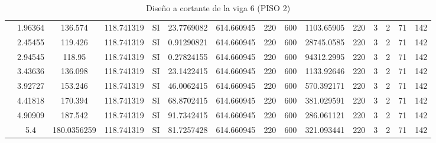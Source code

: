 \begin{table}[H]
{\begin{tabular}{|c|c|c|c|c|c|c|c|c|c|c|c|c|c|c|}
\cline{2-15}    & 1.96364 & 136.574 & 118.741319 & SI  & 23.7769082 & 614.660945 & 220 & 600 & 1103.65905 & 220 & 3   & 2   & 71  & 142 \bigstrut\\
\cline{2-15}    & 2.45455 & 119.426 & 118.741319 & SI  & 0.91290821 & 614.660945 & 220 & 600 & 28745.0585 & 220 & 3   & 2   & 71  & 142 \bigstrut\\
\cline{2-15}    & 2.94545 & 118.95 & 118.741319 & SI  & 0.27824155 & 614.660945 & 220 & 600 & 94312.2995 & 220 & 3   & 2   & 71  & 142 \bigstrut\\
\cline{2-15}    & 3.43636 & 136.098 & 118.741319 & SI  & 23.1422415 & 614.660945 & 220 & 600 & 1133.92646 & 220 & 3   & 2   & 71  & 142 \bigstrut\\
\cline{2-15}    & 3.92727 & 153.246 & 118.741319 & SI  & 46.0062415 & 614.660945 & 220 & 600 & 570.392171 & 220 & 3   & 2   & 71  & 142 \bigstrut\\
\cline{2-15}    & 4.41818 & 170.394 & 118.741319 & SI  & 68.8702415 & 614.660945 & 220 & 600 & 381.029591 & 220 & 3   & 2   & 71  & 142 \bigstrut\\
\cline{2-15}    & 4.90909 & 187.542 & 118.741319 & SI  & 91.7342415 & 614.660945 & 220 & 600 & 286.061121 & 220 & 3   & 2   & 71  & 142 \bigstrut\\
\cline{2-15}    & 5.4 & 180.0356259 & 118.741319 & SI  & 81.7257428 & 614.660945 & 220 & 600 & 321.093441 & 220 & 3   & 2   & 71  & 142 \bigstrut\\
\hline
\end{tabular}%



  }%
    \caption{Diseño a cortante de la viga 6 (PISO 2) }
  \label{tab:C VG6 P2 }%
\end{table}%

